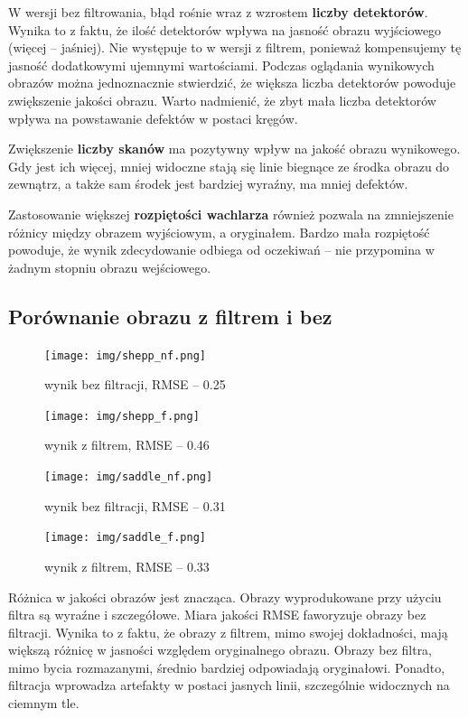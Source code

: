 \documentclass[polish,polish,a4paper]{article}
\begin{document}
		W wersji bez filtrowania, błąd rośnie wraz z wzrostem \textbf{liczby detektorów}.
		Wynika to z faktu, że ilość detektorów wpływa na jasność obrazu wyjściowego (więcej -- jaśniej).
		 Nie występuje to w wersji z filtrem,
		  ponieważ kompensujemy tę jasność dodatkowymi ujemnymi wartościami.
		 Podczas oglądania wynikowych obrazów można jednoznacznie stwierdzić, 
		 że większa liczba detektorów powoduje zwiększenie jakości obrazu.
		 Warto nadmienić, że zbyt mała liczba detektorów wpływa na powstawanie defektów w postaci kręgów. 
		
		
		Zwiększenie \textbf{liczby skanów} ma pozytywny wpływ na jakość obrazu wynikowego.
		Gdy jest ich więcej, mniej widoczne stają się linie biegnące ze środka obrazu do zewnątrz, a także sam środek jest bardziej wyraźny, ma mniej defektów.
		
		Zastosowanie większej \textbf{rozpiętości wachlarza} również pozwala na zmniejszenie różnicy między obrazem wyjściowym, a oryginałem.
		Bardzo mała rozpiętość powoduje, że wynik zdecydowanie odbiega od oczekiwań -- nie przypomina w żadnym stopniu obrazu wejściowego.
		
		\newpage
		\subsection{Porównanie obrazu z filtrem i bez}
			\begin{figure}[!h]
				\centering
				\begin{minipage}{0.45\linewidth}
					\texttt{[image: img/shepp\_nf.png]}
					\caption{wynik bez filtracji, RMSE -- 0.25}
				\end{minipage}
				\hfill
				\begin{minipage}{0.45\linewidth}
					\texttt{[image: img/shepp\_f.png]}
					\caption{wynik z filtrem, RMSE -- 0.46}
				\end{minipage}
			\end{figure}
			
			\begin{figure}[!h]
				\centering
				\begin{minipage}{0.45\linewidth}
					\texttt{[image: img/saddle\_nf.png]}
					\caption{wynik bez filtracji, RMSE -- 0.31}
				\end{minipage}
				\hfill
				\begin{minipage}{0.45\linewidth}
					\texttt{[image: img/saddle\_f.png]}
					\caption{wynik z filtrem, RMSE -- 0.33}
				\end{minipage}
			\end{figure}
			
			Różnica w jakości obrazów jest znacząca. 
			Obrazy wyprodukowane przy użyciu filtra są wyraźne i szczegółowe. 
			Miara jakości RMSE faworyzuje obrazy bez filtracji. 
			Wynika to z faktu, że obrazy z filtrem, mimo swojej dokładności, 
			mają większą różnicę w jasności względem oryginalnego obrazu. 
			Obrazy bez filtra, mimo bycia rozmazanymi, 
			średnio bardziej odpowiadają oryginałowi. 
			Ponadto, filtracja wprowadza artefakty w postaci jasnych linii, 
			szczególnie widocznych na ciemnym tle.
\fi
\end{document}
